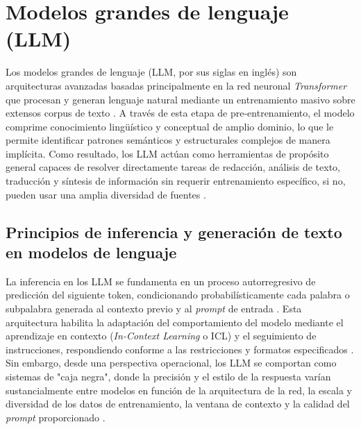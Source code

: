 \documentclass[12pt, letterpaper, oneside]{book}
\begin{document}
\section{Modelos grandes de lenguaje (LLM)} Los modelos grandes de lenguaje (LLM, por sus siglas en inglés) son arquitecturas avanzadas basadas principalmente en la red neuronal \textit{Transformer} que procesan y generan lenguaje natural mediante un entrenamiento masivo sobre extensos corpus de texto  \cite{TrendonAI2026,SurveyforLLM,xiao2026foundationslargelanguagemodels}. A través de esta etapa de pre-entrenamiento, el modelo comprime conocimiento lingüístico y conceptual de amplio dominio, lo que le permite identificar patrones semánticos y estructurales complejos de manera implícita. Como resultado, los LLM actúan como herramientas de propósito general capaces de resolver directamente tareas de redacción, análisis de texto, traducción y síntesis de información sin requerir entrenamiento específico, si no, pueden usar una amplia diversidad de fuentes \cite{TrendonAI2026,SurveyforLLM,xiao2026foundationslargelanguagemodels}. 

\subsection{Principios de inferencia y generación de texto en modelos de lenguaje} La inferencia en los LLM se fundamenta en un proceso autorregresivo de predicción del siguiente token, condicionando probabilísticamente cada palabra o subpalabra generada al contexto previo y al \textit{prompt} de entrada \cite{SurveyforLLM}. Esta arquitectura habilita la adaptación del comportamiento del modelo mediante el aprendizaje en contexto (\textit{In-Context Learning} o ICL) y el seguimiento de instrucciones, respondiendo conforme a las restricciones y formatos especificados \cite{xiao2026foundationslargelanguagemodels}. Sin embargo, desde una perspectiva operacional, los LLM se comportan como sistemas de "caja negra", donde la precisión y el estilo de la respuesta varían sustancialmente entre modelos en función de la arquitectura de la red, la escala y diversidad de los datos de entrenamiento, la ventana de contexto y la calidad del \textit{prompt} proporcionado \cite{xiao2026foundationslargelanguagemodels, SurveyforLLM, shojaee2025illusion}. 
\end{document}
